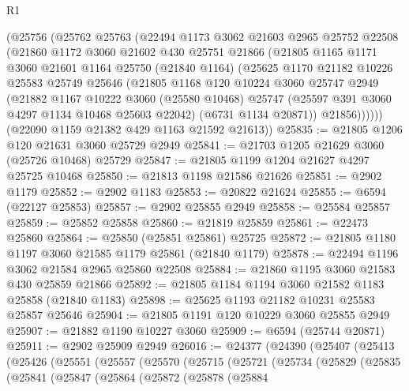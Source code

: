 \begin{lexlean}{R1}
\begin{coremodule}
    (@25756
      (@25762
        @25763
        (@22494
          @1173
          @3062
          @21603
          @2965
          @25752
          @22508
          (@21860
            @1172
            @3060
            @21602
            @430
            @25751
            @21866
            (@21805
              @1165
              @1171
              @3060
              @21601
              @1164
              @25750
              (@21840 @1164)
              (@25625
                @1170
                @21182
                @10226
                @25583
                @25749
                @25646
                (@21805
                  @1168
                  @120
                  @10224
                  @3060
                  @25747
                  @2949
                  (@21882
                    @1167
                    @10222
                    @3060
                    (@25580 @10468)
                    @25747
                    (@25597 @391 @3060 @4297 @1134 @10468 @25603 @22042)
                    (@6731 @1134 @20871))
                  @21856))))))
      (@22090 @1159 @21382 @429 @1163 @21592 @21613))
@25835 := @21805 @1206 @120 @21631 @3060 @25729 @2949
@25841 := @21703 @1205 @21629 @3060 (@25726 @10468) @25729
@25847 := @21805 @1199 @1204 @21627 @4297 @25725 @10468
@25850 := @21813 @1198 @21586 @21626
@25851 := @2902 @1179
@25852 := @2902 @1183
@25853 := @20822 @21624
@25855 := @6594 (@22127 @25853)
@25857 := @2902 @25855 @2949
@25858 := @25584 @25857
@25859 := @25852 @25858
@25860 := @21819 @25859
@25861 := @22473 @25860
@25864 := @25850 (@25851 @25861) @25725
@25872 := @21805 @1180 @1197 @3060 @21585 @1179 @25861 (@21840 @1179)
@25878 := @22494 @1196 @3062 @21584 @2965 @25860 @22508
@25884 := @21860 @1195 @3060 @21583 @430 @25859 @21866
@25892 := @21805 @1184 @1194 @3060 @21582 @1183 @25858 (@21840 @1183)
@25898 := @25625 @1193 @21182 @10231 @25583 @25857 @25646
@25904 := @21805 @1191 @120 @10229 @3060 @25855 @2949
@25907 := @21882 @1190 @10227 @3060
@25909 := @6594 (@25744 @20871)
@25911 := @2902 @25909 @2949
@26016 := @24377
    (@24390
      (@25407
        (@25413
          (@25426
            (@25551
              (@25557
                (@25570
                  (@25715
                    (@25721
                      (@25734
                        (@25829
                          (@25835
                            (@25841
                              (@25847
                                (@25864
                                  (@25872
                                    (@25878
                                      (@25884

\end{coremodule}
\end{lexlean}
